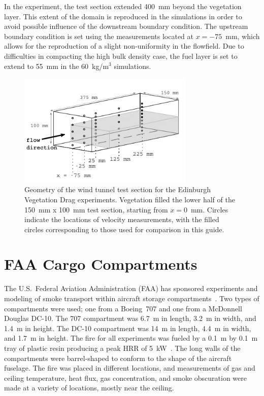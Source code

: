 In the experiment, the test section extended 400~mm beyond the vegetation layer. This extent of the domain is reproduced in the simulations in order to avoid possible influence of the downstream boundary condition. The upstream boundary condition is set using the measurements located at $x=-75$~mm, which allows for the reproduction of a slight non-uniformity in the flowfield. Due to difficulties in compacting the high bulk density case, the fuel layer is set to extend to 55~mm in the 60~kg/m$^3$ simulations.

\begin{figure}[ht]
\centering
\includegraphics[width=0.75\textwidth]{FIGURES/Edinburgh_Vegetation_Drag/domain_schematic}
\caption[Geometry of the Edinburgh Vegetation Drag experiments]{Geometry of the wind tunnel test section for the Edinburgh Vegetation Drag experiments. Vegetation filled the lower half of the 150~mm x 100~mm test section, starting from $x=0$~mm. Circles indicate the locations of velocity measurements, with the filled circles corresponding to those used for comparison in this guide.}
\label{Ed_Veg_Drag_Layout}
\end{figure}

\section{FAA Cargo Compartments}
\label{FAA_Cargo_Description}

The U.S.~Federal Aviation Administration (FAA) has sponsored experiments and modeling of smoke transport within aircraft storage compartments~\cite{FAA-AR-03-49,FAA-AR-07-27}. Two types of compartments were used; one from a Boeing~707 and one from a McDonnell Douglas DC-10. The 707 compartment was 6.7~m in length, 3.2~m in width, and 1.4~m in height. The DC-10 compartment was 14~m in length, 4.4~m in width, and 1.7~m in height. The fire for all experiments was fueled by a 0.1~m by 0.1~m tray of plastic resin producing a peak HRR of 5~kW~\cite{FAA-AR-06-21}. The long walls of the compartments were barrel-shaped to conform to the shape of the aircraft fuselage. The fire was placed in different locations, and measurements of gas and ceiling temperature, heat flux, gas concentration, and smoke obscuration were made at a variety of locations, mostly near the ceiling.


